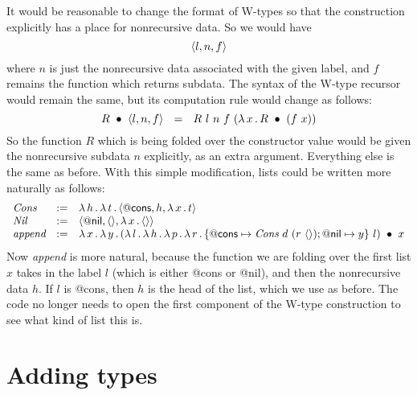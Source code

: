 \documentclass{article}
\begin{document}
It would be reasonable to change the format of W-types so that the construction explicitly has a place for nonrecursive data.  So we would have
\[
\langle l , n, f \rangle
\]
\noindent where $n$ is just the nonrecursive data associated with the given label, and $f$ remains the function which returns subdata.  The syntax of the W-type recursor would remain the same, but its computation rule would change as follows:
\[
\wrec{R}{\ctora{l}{n}{f}} \ \ = \ \ R\ l\ n\ f\ (\lam{x}{\wrec{R}{(f\ x)}})
\]
\noindent So the function $R$ which is being folded over the constructor value would be given
the nonrecursive subdata $n$ explicitly, as an extra argument.  Everything else is the same
as before.  With this simple modification, lists could be written more naturally as
follows:
\[
\begin{array}{lll}
\textit{Cons} & := & \lambda\, h\, .\, \lambda\, t\, .\, \langle \mathsf{@cons} , h, \lambda\, x\, .\, t \rangle \\
\textit{Nil} & := & \langle \mathsf{@nil} , \langle\rangle, \lambda\, x\, .\, \langle\rangle \rangle \\
\textit{append} & := & \lambda\, x\, .\, \lambda\, y\, .\, (\lambda\, l\, .\, \lambda\, h\, .\, \lambda\, p\, .\, \lambda\, r\, .\, \{ \mathsf{@cons}\mapsto \textit{Cons}\ d\ (r\ \langle\rangle); \mathsf{@nil}\mapsto y\}\ l)\ \bullet\ x
\end{array}
\]
\noindent Now \textit{append} is more natural, because the function we are folding over the first list $x$ takes in the label $l$ (which is either \textsf{@cons} or \textsf{@nil}), and then the nonrecursive data $h$.  If $l$ is \textsf{@cons}, then $h$ is the head of the list, which we
use as before.  The code no longer needs to open the first component of the W-type construction to see what kind of list this is.


\section{Adding types}



\end{document}
